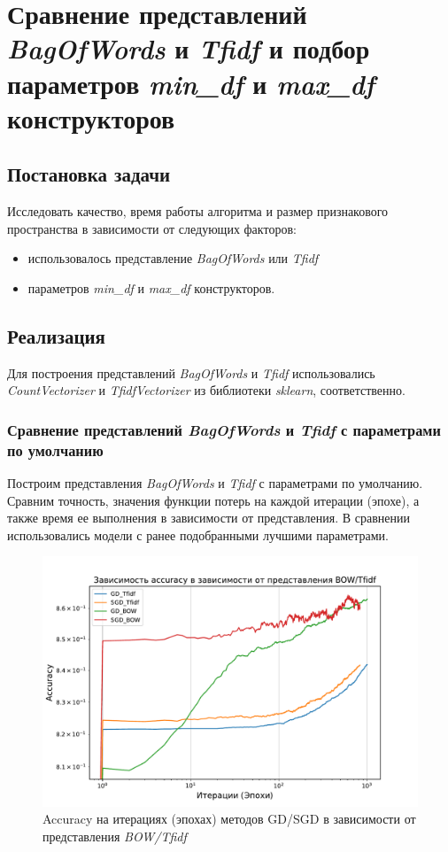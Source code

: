 \documentclass[14pt]{extarticle}
\begin{document}
\section{Сравнение представлений \textit{BagOfWords} и \textit{Tfidf} и подбор параметров \textit{min\_df} и \textit{max\_df} конструкторов}

\subsection{Постановка задачи}

Исследовать качество, время работы алгоритма и размер признакового пространства в зависимости от следующих факторов:

\begin{itemize}
    \item использовалось представление \textit{BagOfWords} или \textit{Tfidf}
    \item параметров \textit{min\_df} и \textit{max\_df} конструкторов.
\end{itemize}

\subsection{Реализация}

Для построения представлений \textit{BagOfWords} и \textit{Tfidf} использовались \textit{CountVectorizer} и \textit{TfidfVectorizer} из библиотеки \textit{sklearn}, соответственно.

\subsubsection{Сравнение представлений \textit{BagOfWords} и \textit{Tfidf} с параметрами по умолчанию}

Построим представления \textit{BagOfWords} и \textit{Tfidf} с параметрами по умолчанию. Сравним точность, значения функции потерь на каждой итерации (эпохе), а также время ее выполнения в зависимости от представления. В сравнении использовались модели с ранее подобранными лучшими параметрами.

\begin{figure}[H]
    \centering
    \includegraphics[width=0.7\linewidth]
    {exp_8_acc.pdf}
    \caption{Accuracy на итерациях (эпохах) методов GD/SGD в зависимости от представления \textit{BOW/Tfidf}}
    \label{fig:exp_8_acc}
\end{figure}
\end{document}
